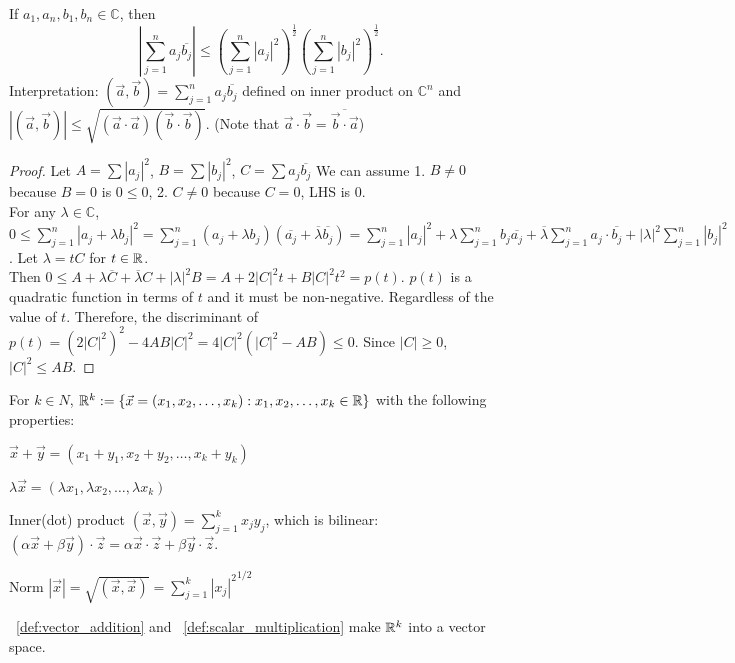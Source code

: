 \begin{thm*}
	If $a_1,a_n,b_1,b_n \in \mathbb{C}$, then
	\[
		|\sum_{j=1}^{n}{a_{j}\overline{b_{j}}}| \le (\sum_{j=1}^{n}{|a_{j}|^2})^{\frac{1}{2}}(\sum_{j=1}^{n}{|b_{j}|^2})^{\frac{1}{2}}
		.\]
	Interpretation: $(\vec{a},\vec{b})=\sum_{j=1}^{n}{a_j \overline{b_j}}$ defined
	on inner product on $\mathbb{C}^{n}$ and $|(\vec{a},\vec{b})|\le \sqrt{(\vec{a}\cdot \vec{a})(\vec{b} \cdot \vec{b})}$. (Note that $\vec{a}\cdot \vec{b}=\overline{\vec{b} \cdot \vec{a}}$)
	\begin{proof}
		Let $A=\sum{|a_j|^2}$, $B=\sum{|b_j|^2}$, $C=\sum{a_j \overline{b_j}}$
		We can assume 1. $B\neq 0$ because $B=0$ is $0\le 0$, 2. $C\neq 0$ because $C=0$, LHS is 0.\\
		For any $\lambda \in \mathbb{C}$, $0\le \sum_{j=1}^{n}|{a_j+\lambda b_j}|^2=\sum_{j=1}^{n}{(a_j+\lambda b_j)(\overline{a_j}+\overline{\lambda}\overline{b_j})}=\sum_{j=1}^{n}{|a_j|^2}+\lambda \sum_{j=1}^{n}{b_j \overline{a_j}}+\overline{\lambda}\sum_{j=1}^{n}{a_j \cdot \overline{b_j}+|\lambda|^2 \sum_{j=1}^{n}{|b_j|^2}}$.
		Let $\lambda=tC$ for $t \in \mathbb{R} $.\\
		Then $0\le A+\lambda \overline{C}+\overline{\lambda}C+|\lambda|^2B
			=A+2|C|^2t+B|C|^2t^2=p(t)$.
		$p(t)$ is a quadratic function in terms of $t$ and it must be non-negative. Regardless of the value of $t$. Therefore, the discriminant of $p(t)=(2|C|^2)^2-4AB|C|^2=4|C|^2(|C|^2-AB) \le 0$. Since $|C|\ge 0$, $|C|^2\le AB$.
	\end{proof}
\end{thm*}


\begin{definition}
	For $k \in N$, $\mathbb{R} ^{k}:=\{ \vec{x}=(x_1,x_2,\ldots,x_k):x_1,x_2,\ldots,x_k \in \mathbb{R}\}$ with the following properties:
	\begin{describe}
		\item[\namedlabel{def:vector_addition}{Addition}]  $\vec{x}+\vec{y}=(x_1+y_1,x_2+y_2,\ldots,x_k+y_k)$
		\item[\namedlabel{def:scalar_multiplication}{Scalar multiplication}] $\lambda \vec{x}=(\lambda x_1,\lambda x_2,\ldots,\lambda x_k)$
		\item[Inner(dot) product] $(\vec{x},\vec{y})=\sum_{j=1}^{k}{x_j y_j}$, which is bilinear: $(\alpha \vec{x}+\beta \vec{y})\cdot \vec{z}=\alpha \vec{x} \cdot  \vec{z} + \beta \vec{y} \cdot \vec{z}$.
		\item[Norm] $|\vec{x}|=\sqrt{(\vec{x},\vec{x})}={\sum_{j=1}^{k}{|x_j|^2}}^{1/2}$
	\end{describe}
	\begin{remark}
		~\ref*{def:vector_addition} and ~\ref*{def:scalar_multiplication} make $\mathbb{R} ^{k}$ into a vector space.
	\end{remark}
\end{definition}

